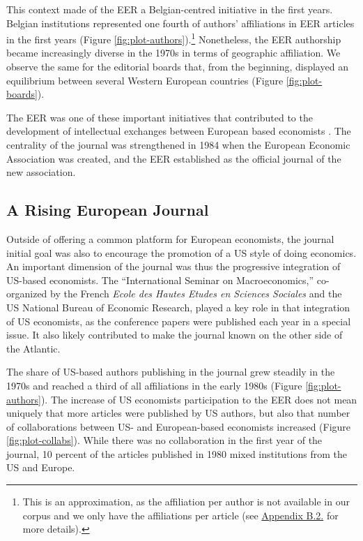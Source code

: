 \documentclass[]{elsarticle} %
\begin{document}
This context made of the EER a Belgian-centred initiative in the first
years. Belgian institutions represented one fourth of authors'
affiliations in EER articles in the first years (Figure
\ref{fig:plot-authors}).\footnote{This is an approximation, as the
  affiliation per author is not available in our corpus and we only have
  the affiliations per article (see
  \protect\hyperlink{author-affiliation}{Appendix B.2.} for more
  details).} Nonetheless, the EER authorship became increasingly diverse
in the 1970s in terms of geographic affiliation. We observe the same for
the editorial boards that, from the beginning, displayed an equilibrium
between several Western European countries (Figure
\ref{fig:plot-boards}).

The EER was one of these important initiatives that contributed to the
development of intellectual exchanges between European based economists
\citep{goutsmedt2021}. The centrality of the journal was strengthened in
1984 when the European Economic Association was created, and the EER
established as the official journal of the new association.

\hypertarget{rising-journal}{%
\subsection{A Rising European Journal}\label{rising-journal}}

Outside of offering a common platform for European economists, the
journal initial goal was also to encourage the promotion of a US style
of doing economics. An important dimension of the journal was thus the
progressive integration of US-based economists. The ``International
Seminar on Macroeconomics,'' co-organized by the French \emph{Ecole des
Hautes Etudes en Sciences Sociales} and the US National Bureau of
Economic Research, played a key role in that integration of US
economists, as the conference papers were published each year in a
special issue. It also likely contributed to make the journal known on
the other side of the Atlantic.

The share of US-based authors publishing in the journal grew steadily in
the 1970s and reached a third of all affiliations in the early 1980s
(Figure \ref{fig:plot-authors}). The increase of US economists
participation to the EER does not mean uniquely that more articles were
published by US authors, but also that number of collaborations between
US- and European-based economists increased (Figure
\ref{fig:plot-collabs}). While there was no collaboration in the first
year of the journal, 10 percent of the articles published in 1980 mixed
institutions from the US and Europe.
\end{document}
